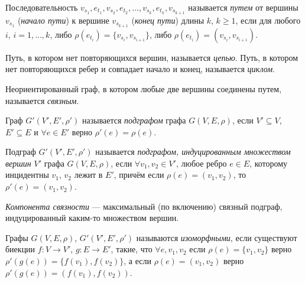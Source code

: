 \begin{definition}
    Последовательность $v_{s_1}, e_{t_1}, v_{s_2}, e_{t_2}, \ldots, v_{s_k}, e_{t_k}, v_{s_{k+1}}$ называется \textit{путем} от вершины $v_{s_1}$ (\textit{начало пути}) к вершине $v_{s_{k+1}}$ (\textit{конец пути}) длины $k$, $k \geqslant 1$, если для любого $i$, $i = 1, \ldots, k$, либо $\rho(e_{t_i}) = \{v_{s_i}, v_{s_{i+1}} \}$, либо $\rho(e_{t_i}) = (v_{s_i}, v_{s_{i+1}})$.
\end{definition}

\begin{definition}
    Путь, в котором нет повторяющихся вершин, называется \textit{цепью}.
    Путь, в котором нет повторяющихся ребер и совпадает начало и конец, называется \textit{циклом}.
\end{definition}

\begin{definition}
    Неориентированный граф, в котором любые две вершины соединены путем, называется \textit{связным}.
\end{definition}

\begin{definition}
    Граф $G'(V', E', \rho')$ называется \textit{подграфом} графа $G(V, E, \rho)$, если $V' \subseteq V$, $E' \subseteq E$ и $\forall e \in E'$ верно $\rho'(e) = \rho(e)$. 
\end{definition}

\begin{definition}
    Подграф $G'(V', E', \rho')$ называется \textit{подграфом, индуцированным множеством вершин} $V'$ графа $G(V, E, \rho)$, если $\forall v_1, v_2 \in V'$, любое ребро $e \in E$, которому инцидентны $v_1$, $v_2$ лежит в $E'$, причём если $\rho(e) = (v_1, v_2)$, то $\rho'(e) = (v_1,v_2)$.
\end{definition}

\begin{definition}
    \textit{Компонента связности} --- максимальный (по включению) связный подграф, индуцированный каким-то множеством вершин.
\end{definition}

\begin{definition}
    Графы $G(V, E, \rho)$, $G'(V', E', \rho')$ называются \textit{изоморфными}, если существуют биекции $f: V \to V'$, $g: E\to E'$, такие, что $\forall e, v_1, v_2$ если $\rho(e) = \{v_1, v_2\}$ верно $\rho'(g(e)) = \{f(v_1), f(v_2)\}$, а если $\rho(e) = (v_1, v_2)$ верно $\rho'(g(e)) = (f(v_1), f(v_2))$.
\end{definition}

